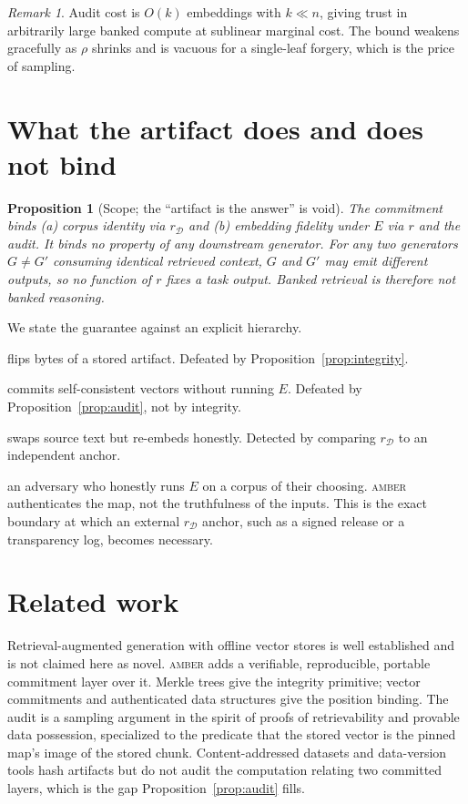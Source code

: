 \documentclass[10pt,twocolumn]{article}
\newtheorem{proposition}{Proposition}
\theoremstyle{remark}
\newtheorem{remark}{Remark}
\begin{document}
\begin{remark}
Audit cost is $O(k)$ embeddings with $k\ll n$, giving trust in arbitrarily large
banked compute at sublinear marginal cost. The bound weakens gracefully as
$\rho$ shrinks and is vacuous for a single-leaf forgery, which is the price of
sampling.
\end{remark}

\section{What the artifact does and does not bind}
\label{sec:adv}
\begin{proposition}[Scope; the ``artifact is the answer'' is void]
\label{prop:void}
The commitment binds (a) corpus identity via $r_{\mathcal D}$ and (b) embedding
fidelity under $E$ via $r$ and the audit. It binds no property of any downstream
generator. For any two generators $G\neq G'$ consuming identical retrieved
context, $G$ and $G'$ may emit different outputs, so no function of $r$ fixes a
task output. Banked \emph{retrieval} is therefore not banked \emph{reasoning}.
\end{proposition}

We state the guarantee against an explicit hierarchy.
\begin{description}[leftmargin=1.2em,itemsep=1pt]
\item[$\mathcal A_1$ transport tamperer] flips bytes of a stored artifact.
Defeated by Proposition~\ref{prop:integrity}.
\item[$\mathcal A_2$ lazy forger] commits self-consistent vectors without
running $E$. Defeated by Proposition~\ref{prop:audit}, not by integrity.
\item[$\mathcal A_3$ corpus substituter] swaps source text but re-embeds
honestly. Detected by comparing $r_{\mathcal D}$ to an independent anchor.
\item[Out of scope] an adversary who honestly runs $E$ on a corpus of their
choosing. \textsc{amber} authenticates the map, not the truthfulness of the
inputs. This is the exact boundary at which an external $r_{\mathcal D}$ anchor,
such as a signed release or a transparency log, becomes necessary.
\end{description}

\section{Related work}
Retrieval-augmented generation with offline vector stores is well established and
is not claimed here as novel. \textsc{amber} adds a verifiable, reproducible,
portable commitment layer over it. Merkle trees give the integrity primitive;
vector commitments and authenticated data structures give the position binding.
The audit is a sampling argument in the spirit of proofs of retrievability and
provable data possession, specialized to the predicate that the stored vector is
the pinned map's image of the stored chunk. Content-addressed datasets and
data-version tools hash artifacts but do not audit the computation relating two
committed layers, which is the gap Proposition~\ref{prop:audit} fills.
\end{document}
